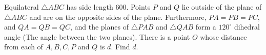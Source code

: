Equilateral $\triangle ABC$ has side length $600$. Points $P$ and $Q$ lie outside of the plane of $\triangle ABC$ and are on the opposite sides of the plane. Furthermore, $PA=PB=PC$, and $QA=QB=QC$, and the planes of $\triangle PAB$ and $\triangle QAB$ form a $120^{\circ}$ dihedral angle (The angle between the two planes). There is a point $O$ whose distance from each of $A,B,C,P$ and $Q$ is $d$. Find $d$.